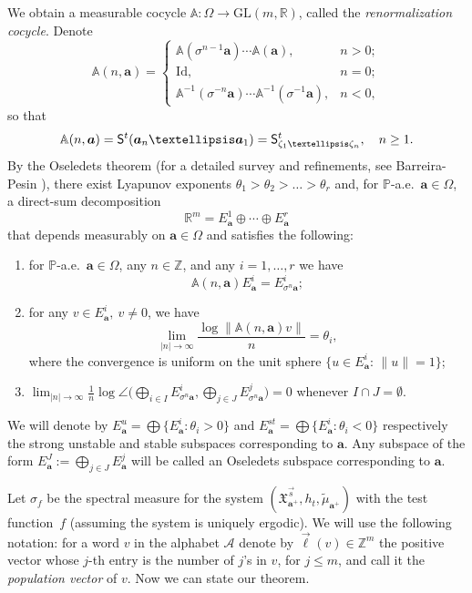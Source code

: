 \documentclass[11pt]{article}
\numberwithin{equation}{section}\newcommand{\Relation}[2][]{}\newtheorem*{prop*}{Proposition}
\let\mathcal\mathscr
\newenvironment{enumeratei}
{\bgroup\def\theenumi{\roman{enumi}}\def\theenumii{\arabic{enumii}}\begin{enumerate}}
{\end{enumerate}\egroup}
\newcommand{\Id}{\mathrm{Id}}
\newcommand{\GL}{\mathrm{GL}}
\theoremstyle{plain}
\theoremstyle{definition}
\let\wt\widetilde
\newcommand\bom{{\boldsymbol a}}\let\ba\bom
\let\es\emptyset
\let\Om\Omega
\let\sig\sigma
\newcommand\Xx{\mathfrak{X}}
\newcommand\Ak{\mathcal{A}}
\newcommand\Aa{\mathbb{A}}
\newcommand{\R}{\mathbb{R}}
\newcommand{\Z}{\mathbb{Z}}
\renewcommand{\P}{\mathbb{P}}
\newcommand\Sf{{\sf S}}
\newcommand\be{\begin{equation}}
\newcommand\ee{\end{equation}}
\begin{document}
We obtain a measurable cocycle $\Aa: \Om\to \GL(m,\R)$, called the \emph{renormalization cocycle}. Denote\vspace*{-3pt}
\begin{equation}\label{renormcoc}
\Aa(n,\bom) = \begin{cases} \Aa(\sig^{n-1}\bom)\cdots \Aa(\bom), & n> 0; \\
\Id, & n=0; \\
\Aa^{-1}(\sig^{-n}\bom) \cdots \Aa^{-1}(\sig^{-1}\bom), & n<0,\end{cases}
\end{equation}
so that\vspace*{-3pt}
\[
\Aa(n,\bom) = \Sf^t(\bom_n\ldots \bom_1)= \Sf^t_{\zeta_1\ldots\zeta_n},\quad n\ge 1.\]
By the Oseledets theorem \cite{oseledets} (for a detailed survey and refinements, see Barreira-Pesin \cite[Th.\,3.5.5]{barpes}),
there exist Lyapunov exponents $\theta_1> \theta_2 > \ldots > \theta_r$ and, for $\P$-a.e.\ $\bom\in \Om$, a direct-sum decomposition\vspace*{-3pt}
\be \label{os1}
\R^m = E^1_\bom \oplus \cdots \oplus E^r_\bom
\ee
that depends measurably on $\bom\in \Om$ and satisfies the following:
\begin{enumeratei}
\item\label{sec:3i}
for $\P$-a.e.\ $\bom\in \Om$, any $n\in\Z$, and any $i=1,\ldots,r$ we have
\[
\Aa(n,\bom) E^i_\bom = E^i_{\sig^n\bom};
\]

\item\label{sec:3ii}
for any $v\in E^i_\bom,\ v\ne 0$, we have
\[
\lim_{|n|\to \infty} \frac{\log\|\Aa(n,\bom)v\|}{n} = \theta_i,
\]
where the convergence is uniform on the unit sphere $\{u\in E^i_\bom:\, \|u\|=1\}$;

\item\label{sec:3iii}
$\lim_{|n|\to \infty} \frac{1}{n}\log\angle\bigl(\bigoplus_{i\in I} E^i_{\sig^n\bom}, \bigoplus_{j\in J} E^j_{\sig^n \bom} \bigr) =0$ whenever $I\cap J = \es$.
\end{enumeratei}

We will denote by $E_\bom^{u}=\bigoplus\{E^i_\bom:\theta_i>0\}$ and $E_\bom^{st}=\bigoplus\{E^i_\bom:\theta_i<0\}$ respectively the strong unstable and stable subspaces corresponding to $\bom$. Any subspace of the form $E_\bom^J:=\bigoplus_{j\in J} E^j_\bom$ will be called an Oseledets subspace corresponding to $\bom$.

Let $\sig_f$ be the spectral measure for the system $(\Xx_{\bom^+}^{\vec{s}},h_t,\wt\mu_{\bom^+})$ with the test function~$f$ (assuming the system is uniquely ergodic).
We will use the following notation: for a word $v$ in the alphabet $\Ak$ denote by $\vec{\ell}(v)\in \Z^m$ the positive vector whose $j$-th entry is the number of $j$'s in $v$, for $j\le m$,
and call it the \emph{population vector} of $v$.
Now we can state our theorem.
\end{document}

